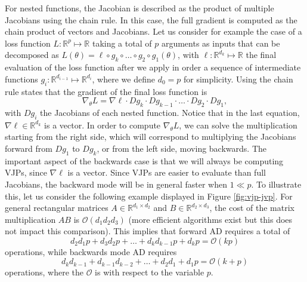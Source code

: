 For nested functions, the Jacobian is described as the product of multiple Jacobians using the chain rule.
In this case, the full gradient is computed as the chain product of vectors and Jacobians. 
Let us consider for example the case of a loss function $L : \mathbb R^p \mapsto \mathbb R$ taking a total of $p$ arguments as inputs that can be decomposed as $L(\theta) = \ell \circ g_{k} \circ \ldots \circ g_2 \circ g_1(\theta)$, with $\ell : \mathbb R^{d_k} \mapsto \mathbb R$ the final evaluation of the loss function after we apply in order a sequence of intermediate functions $g_i : \mathbb R^{d_{i-1}} \mapsto \mathbb R^{d_i}$, where we define $d_0 = p$ for simplicity. 
Using the chain rule states that the gradient of the final loss function is
\begin{equation}
 \nabla_\theta L = \nabla \ell \cdot Dg_{k} \cdot Dg_{k-1} \cdot \ldots \cdot Dg_2 \cdot Dg_1, 
\end{equation}
with $Dg_i$ the Jacobians of each nested function. 
Notice that in the last equation, $\nabla \ell \in \mathbb R^{d_k}$ is a vector.
In order to compute $\nabla_\theta L$, we can solve the multiplication starting from the right side, which will correspond to multiplying the Jacobians forward from $Dg_1$ to $Dg_k$, or from the left side, moving backwards. 
The important aspect of the backwards case is that we will always be computing VJPs, since $\nabla \ell$ is a vector.
Since VJPs are easier to evaluate than full Jacobians, the backward mode will be in general faster when $1 \ll p$.
To illustrate this, let us consider the following example displayed in Figure \ref{fig:vjp-jvp}. 
For general rectangular matrices $A\in \mathbb R^{d_1 \times d_2}$ and $B \in \mathbb R^{d_2 \times d_3}$, the cost of the matrix multiplication $AB$ is $\mathcal O (d_1 d_2 d_3)$ (more efficient algorithms exist but this does not impact this comparison). This implies that forward AD requires a total of
\begin{equation}
 d_2 d_1 p + d_3 d_2 p + \ldots + d_k d_{k-1} p + d_k p = \mathcal O (kp)
\end{equation}
operations, while backwards mode AD requires
\begin{equation}
 d_k d_{k-1} + d_{k-1} d_{k-2} + \ldots + d_2 d_1 + d_1 p = \mathcal O (k+p)
\end{equation}
operations, where the $\mathcal O$ is with respect to the variable $p$. 

